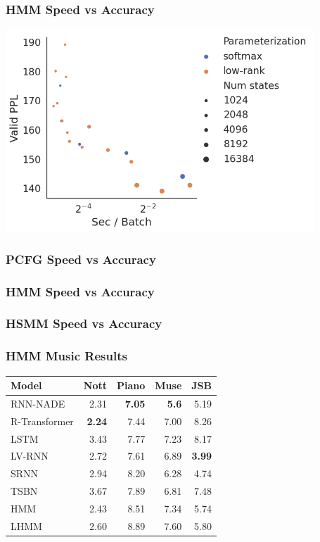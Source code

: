 \documentclass{beamer}
\begin{document}
\begin{frame}
\frametitle{HMM Speed vs Accuracy}
\centering
\includegraphics[height=3in]{imgs/hmm/lhmm-speed-accuracy.png}
\end{frame}

\begin{frame}
\frametitle{PCFG Speed vs Accuracy}
\end{frame}
\begin{frame}
\frametitle{HMM Speed vs Accuracy}
\end{frame}

\begin{frame}
\frametitle{HSMM Speed vs Accuracy}
\end{frame}

\begin{frame}
\frametitle{HMM Music Results}
\centering
\begin{tabular}{lrrrr}
\toprule
Model       & Nott & Piano & Muse & JSB \\
\midrule
RNN-NADE & 2.31  & \textbf{7.05}        & \textbf{5.6}        & 5.19          \\
R-Transformer & \textbf{2.24} & 7.44 & 7.00 & 8.26 \\
LSTM  & 3.43 & 7.77   & 7.23 & 8.17     \\
LV-RNN    & 2.72       & 7.61        & 6.89       &\textbf{ 3.99}\\
SRNN     & 2.94       & 8.20         & 6.28       & 4.74          \\
\midrule
TSBN     & 3.67       & 7.89        & 6.81       & 7.48          \\
HMM &  2.43 & 8.51 & 7.34 & 5.74 \\
LHMM & 2.60 & 8.89 & 7.60 & 5.80 \\
\bottomrule
\end{tabular}
\end{frame}
\end{document}

